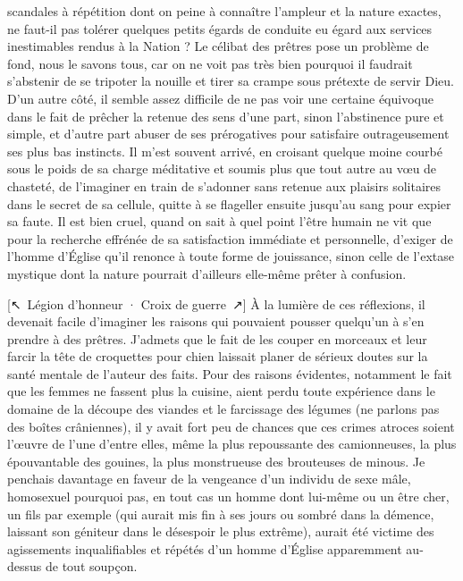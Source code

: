 scandales à répétition dont on peine à connaître l’ampleur et la nature exactes, ne faut-il pas tolérer quelques petits égards de conduite eu égard aux services inestimables rendus à la Nation ? Le célibat des prêtres pose un problème de fond, nous le savons tous, car on ne voit pas très bien pourquoi il faudrait s’abstenir de se tripoter la nouille et tirer sa crampe sous prétexte de servir Dieu. D’un autre côté, il semble assez difficile de ne pas voir une certaine équivoque dans le fait de prêcher la retenue des sens d’une part, sinon l’abstinence pure et simple, et d’autre part abuser de ses prérogatives pour satisfaire outrageusement ses plus bas instincts. Il m’est souvent arrivé, en croisant quelque moine courbé sous le poids de sa charge méditative et soumis plus que tout autre au vœu de chasteté, de l’imaginer en train de s’adonner sans retenue aux plaisirs solitaires dans le secret de sa cellule, quitte à se flageller ensuite jusqu’au sang pour expier sa faute. Il est bien cruel, quand on sait à quel point l’être humain ne vit que pour la recherche effrénée de sa satisfaction immédiate et personnelle, d’exiger de l’homme d’Église qu’il renonce à toute forme de jouissance, sinon celle de l’extase mystique dont la nature pourrait d’ailleurs elle-même prêter à confusion.

%
%
[↖~Légion d'honneur · Croix de guerre~↗]%
À la lumière de ces réflexions, il devenait facile d’imaginer les raisons qui pouvaient pousser quelqu’un à s’en prendre à des prêtres. J’admets que le fait de les couper en morceaux et leur farcir la tête de croquettes pour chien laissait planer de sérieux doutes sur la santé mentale de l’auteur des faits. Pour des raisons évidentes, notamment le fait que les femmes ne fassent plus la cuisine, aient perdu toute expérience dans le domaine de la découpe des viandes et le farcissage des légumes (ne parlons pas des boîtes crâniennes), il y avait fort peu de chances que ces crimes atroces soient l’œuvre de l’une d’entre elles, même la plus repoussante des camionneuses, la plus épouvantable des gouines, la plus monstrueuse des brouteuses de minous. Je penchais davantage en faveur de la vengeance d’un individu de sexe mâle, homosexuel pourquoi pas, en tout cas un homme dont lui-même ou un être cher, un fils par exemple (qui aurait mis fin à ses jours ou sombré dans la démence, laissant son géniteur dans le désespoir le plus extrême), aurait été victime des agissements inqualifiables et répétés d’un homme d’Église apparemment au-dessus de tout soupçon.

